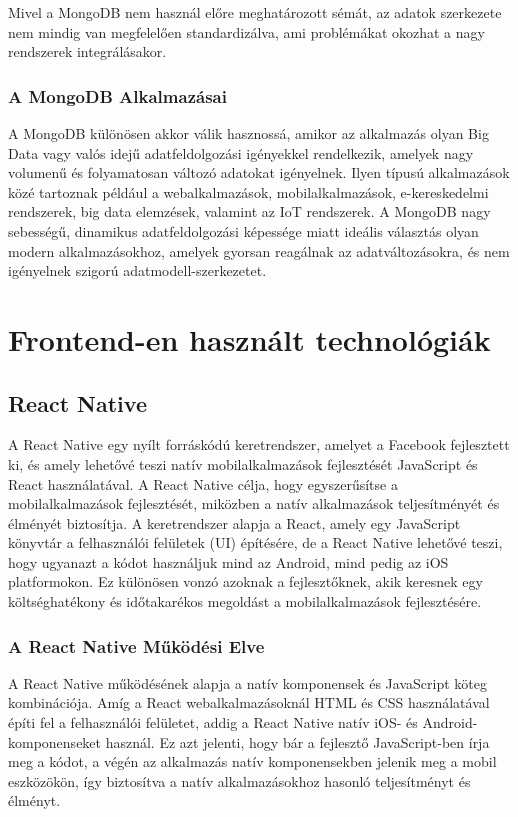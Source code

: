 \documentclass[
]{thesis-ekf}
\theoremstyle{definition}
\theoremstyle{remark}
\begin{document}
Mivel a MongoDB nem használ előre meghatározott sémát, az adatok szerkezete nem mindig van megfelelően standardizálva, ami problémákat okozhat a nagy rendszerek integrálásakor.

\subsection{A MongoDB Alkalmazásai}
A MongoDB különösen akkor válik hasznossá, amikor az alkalmazás olyan Big Data vagy valós idejű adatfeldolgozási igényekkel rendelkezik, amelyek nagy volumenű és folyamatosan változó adatokat igényelnek. Ilyen típusú alkalmazások közé tartoznak például a webalkalmazások, mobilalkalmazások, e-kereskedelmi rendszerek, big data elemzések, valamint az IoT rendszerek. A MongoDB nagy sebességű, dinamikus adatfeldolgozási képessége miatt ideális választás olyan modern alkalmazásokhoz, amelyek gyorsan reagálnak az adatváltozásokra, és nem igényelnek szigorú adatmodell-szerkezetet.

\chapter{Frontend-en használt technológiák}
\section{React Native}

A React Native egy nyílt forráskódú keretrendszer, amelyet a Facebook fejlesztett ki, és amely lehetővé teszi natív mobilalkalmazások fejlesztését JavaScript és React használatával. A React Native célja, hogy egyszerűsítse a mobilalkalmazások fejlesztését, miközben a natív alkalmazások teljesítményét és élményét biztosítja. A keretrendszer alapja a React, amely egy JavaScript könyvtár a felhasználói felületek (UI) építésére, de a React Native lehetővé teszi, hogy ugyanazt a kódot használjuk mind az Android, mind pedig az iOS platformokon. Ez különösen vonzó azoknak a fejlesztőknek, akik keresnek egy költséghatékony és időtakarékos megoldást a mobilalkalmazások fejlesztésére.

\subsection{A React Native Működési Elve}

A React Native működésének alapja a natív komponensek és JavaScript köteg kombinációja. Amíg a React webalkalmazásoknál HTML és CSS használatával építi fel a felhasználói felületet, addig a React Native natív iOS- és Android-komponenseket használ. Ez azt jelenti, hogy bár a fejlesztő JavaScript-ben írja meg a kódot, a végén az alkalmazás natív komponensekben jelenik meg a mobil eszközökön, így biztosítva a natív alkalmazásokhoz hasonló teljesítményt és élményt.
\end{document}
